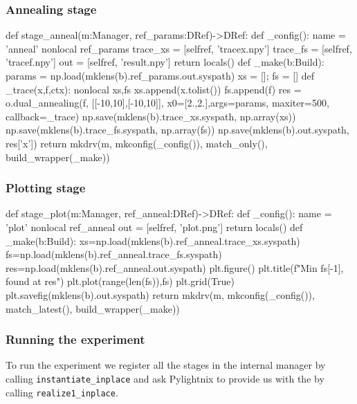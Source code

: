 \subsubsection{Annealing stage}

\begin{pythontexcode}
def stage_anneal(m:Manager, ref_params:DRef)->DRef:
  def _config():
    name = 'anneal'
    nonlocal ref_params
    trace_xs = [selfref, 'tracex.npy']
    trace_fs = [selfref, 'tracef.npy']
    out = [selfref, 'result.npy']
    return locals()
  def _make(b:Build):
    params = np.load(mklens(b).ref_params.out.syspath)
    xs = []; fs = []
    def _trace(x,f,ctx):
      nonlocal xs,fs
      xs.append(x.tolist())
      fs.append(f)
    res = o.dual_annealing(f, [[-10,10],[-10,10]],
                         x0=[2.,2.],args=params,
                         maxiter=500, callback=_trace)
    np.save(mklens(b).trace_xs.syspath, np.array(xs))
    np.save(mklens(b).trace_fs.syspath, np.array(fs))
    np.save(mklens(b).out.syspath, res['x'])
  return mkdrv(m, mkconfig(_config()), match_only(), build_wrapper(_make))
\end{pythontexcode}

\subsubsection{Plotting stage}

\begin{pythontexcode}
def stage_plot(m:Manager, ref_anneal:DRef)->DRef:
  def _config():
    name = 'plot'
    nonlocal ref_anneal
    out = [selfref, 'plot.png']
    return locals()
  def _make(b:Build):
    xs=np.load(mklens(b).ref_anneal.trace_xs.syspath)
    fs=np.load(mklens(b).ref_anneal.trace_fs.syspath)
    res=np.load(mklens(b).ref_anneal.out.syspath)
    plt.figure()
    plt.title(f"Min {fs[-1]}, found at {res}")
    plt.plot(range(len(fs)),fs)
    plt.grid(True)
    plt.savefig(mklens(b).out.syspath)
  return mkdrv(m, mkconfig(_config()), match_latest(), build_wrapper(_make))
\end{pythontexcode}

\subsubsection{Running the experiment}

To run the experiment we register all the stages in the internal manager by
calling \texttt{instantiate\_inplace} and ask Pylightnix to provide us with the
 by calling
\texttt{realize1\_inplace}.

